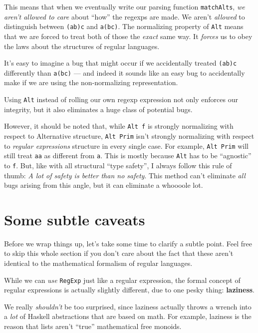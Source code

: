 \documentclass[]{article}
\begin{document}
This means that when we eventually write our parsing function
\texttt{matchAlts}, \emph{we aren't allowed to care} about ``how'' the regexps
are made. We aren't \emph{allowed} to distinguish between
\texttt{(a\textbar{}b)\textbar{}c} and \texttt{a\textbar{}(b\textbar{}c)}. The
normalizing property of \texttt{Alt} means that we are forced to treat both of
those the \emph{exact} same way. It \emph{forces} us to obey the laws about the
structures of regular languages.

It's easy to imagine a bug that might occur if we accidentally treated
\texttt{(a\textbar{}b)\textbar{}c} differently than
\texttt{a\textbar{}(b\textbar{}c)} --- and indeed it sounds like an easy bug to
accidentally make if we are using the non-normalizing representation.

Using \texttt{Alt} instead of rolling our own regexp expression not only
enforces our integrity, but it also eliminates a huge class of potential bugs.

However, it should be noted that, while \texttt{Alt\ f} is strongly normalizing
with respect to Alternative structure, \texttt{Alt\ Prim} isn't strongly
normalizing with respect to \emph{regular expressions} structure in every single
case. For example, \texttt{Alt\ Prim} will still treat \texttt{a\textbar{}a} as
different from \texttt{a}. This is mostly because \texttt{Alt} has to be
``agnostic'' to \texttt{f}. But, like with all structural ``type safety'', I
always follow this rule of thumb: \emph{A lot of safety is better than no
safety}. This method can't eliminate \emph{all} bugs arising from this angle,
but it can eliminate a whoooole lot.

\hypertarget{some-subtle-caveats}{%
\section{Some subtle caveats}\label{some-subtle-caveats}}

Before we wrap things up, let's take some time to clarify a subtle point. Feel
free to skip this whole section if you don't care about the fact that these
aren't identical to the mathematical formalism of regular languages.

While we can \emph{use} \texttt{RegExp} just like a regular expression, the
formal concept of regular expressions is actually slightly different, due to one
pesky thing: \textbf{laziness}.

We really \emph{shouldn't} be too surprised, since laziness actually throws a
wrench into a \emph{lot} of Haskell abstractions that are based on math. For
example, laziness is the reason that lists aren't ``true'' mathematical free
monoids.
\end{document}
